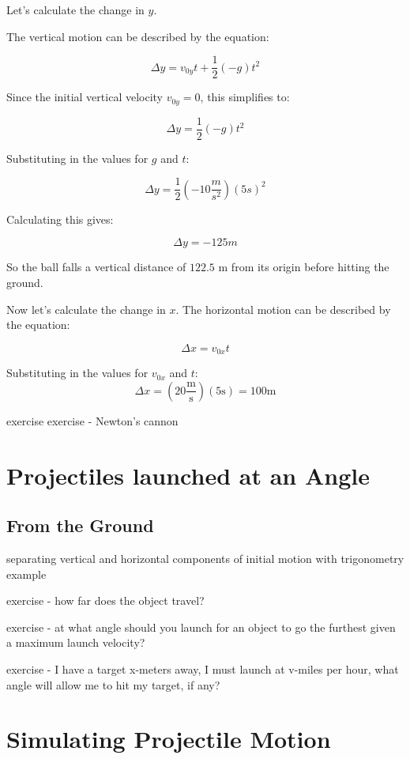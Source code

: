 \begin{tikzpicture}
\end{tikzpicture}

Let's calculate the change in $y$. 

The vertical motion can be described by the equation:

\[
\Delta y = v_{0y} t + \frac{1}{2} (-g) t^2
\]

Since the initial vertical velocity $v_{0y} = 0$, this simplifies to:

\[
\Delta y = \frac{1}{2} (-g) t^2
\]

Substituting in the values for $g$ and $t$:

\[
\Delta y = \frac{1}{2} (-10 \frac{m}{s^2}) (5 s)^2
\]

Calculating this gives:

\[
\Delta y = -125 m
\]

So the ball falls a vertical distance of $122.5$ m from its origin before hitting the ground.

Now let's calculate the change in $x$.
The horizontal motion can be described by the equation:

\[
\Delta x = v_{0x} t
\]

Substituting in the values for $v_{0x}$ and $t$:
\[
\Delta x = (20 \frac{\text{m}}{\text{s}}) (5 \text{s}) = 100 \text{m}
\]

exercise
exercise - Newton's cannon %

\section{Projectiles launched at an Angle}
\subsection{From the Ground}

separating vertical and horizontal components of initial motion with trigonometry
example

exercise - how far does the object travel?

exercise - at what angle should you launch for an object to go the furthest given a maximum launch velocity?

exercise - I have a target x-meters away, I must launch at v-miles per hour, what angle will allow me to hit my target, if any?

\section{Simulating Projectile Motion}
